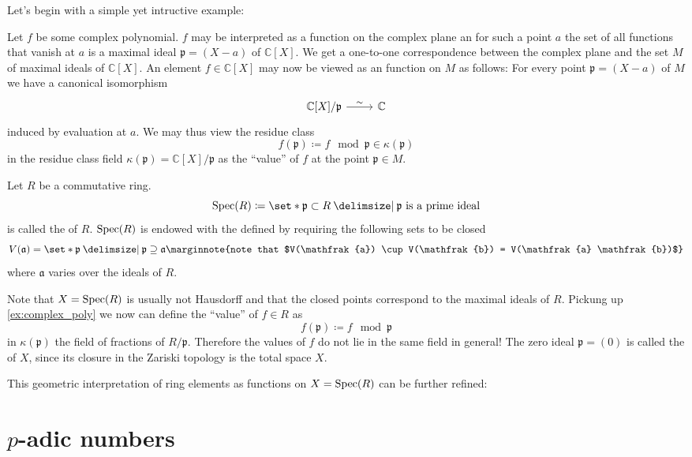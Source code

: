 Let's begin with a simple yet intructive example:
\begin{example}
	\label{ex:complex_poly}
	Let $f$ be some complex polynomial.
	$f$ may be interpreted as a function on the complex plane an for such a point $a$ the set of all functions that vanish at $a$ is a maximal ideal $\mathfrak{p}=(X-a)$ of $\mathbb{C}[X]$.
	We get a one-to-one correspondence between the complex plane and the set $M$ of maximal ideals of $\mathbb{C}[X]$.
	An element $f \in \mathbb{C}[X]$ may now be viewed as an function on $M$ as follows:
	For every point $\mathfrak{p}=(X-a)$ of $M$ we have a canonical isomorphism
	\[
		\begin{tikzcd}
			\mathbb{C}[X]/\mathfrak{p} \rar["\sim"] & \mathbb{C}
		\end{tikzcd}
	\]
	induced by evaluation at $a$.
	We may thus view the residue class
	\[
		f(\mathfrak{p}) \coloneqq f \mod \mathfrak{p} \in \kappa(\mathfrak{p})
	\]
	in the residue class field $\kappa(\mathfrak{p}) = \mathbb{C}[X]/\mathfrak{p}$ as the \enquote{value} of $f$ at the point $\mathfrak{p} \in M$.
\end{example}

\begin{definition}[{name=[prime spectrum]}]
	Let $R$ be a commutative ring.
	\[
		\Spec(R) \coloneqq \set*{\mathfrak{p} \subset R \given \mathfrak{p} \text{ is a prime ideal} }
	\]
	is called the  of $R$.
	$\operatorname{Spec}(R)$ is endowed with the  defined by requiring the following sets to be closed
	\[
		V(\mathfrak{a}) = \set*{\mathfrak{p} \given \mathfrak{p} \supseteq \mathfrak{a}}\marginnote{note that $V(\mathfrak{a}) \cup V(\mathfrak{b}) = V(\mathfrak{a} \mathfrak{b})$}
	\]
	where $\mathfrak{a}$ varies over the ideals of $R$.
\end{definition}

Note that $X= \operatorname{Spec}(R)$ is usually not Hausdorff and that the closed points correspond to the maximal ideals of $R$.
Pickung up \cref{ex:complex_poly} we now can define the \enquote{value} of $f \in R$  as
\[
	f(\mathfrak{p}) \coloneqq f \mod \mathfrak{p}
\]
in $\kappa(\mathfrak{p})$ the field of fractions of $R/\mathfrak{p}$.
Therefore the values of $f$ do not lie in the same field in general!
The zero ideal $\mathfrak{p}= (0)$ is called the  of $X$, since its closure in the Zariski topology is the total space $X$.

This geometric interpretation of ring elements as functions on $X=\operatorname{Spec}(R)$ can be further refined:




\section{$p$-adic numbers}
\label{sec:p-adic numbers}







\cleardoubleoddemptypage%
\setcounter{page}{1}
\appendix%
\printbibliography%
\printindex%
\todototoc%
\listoftodos[To-do's]

